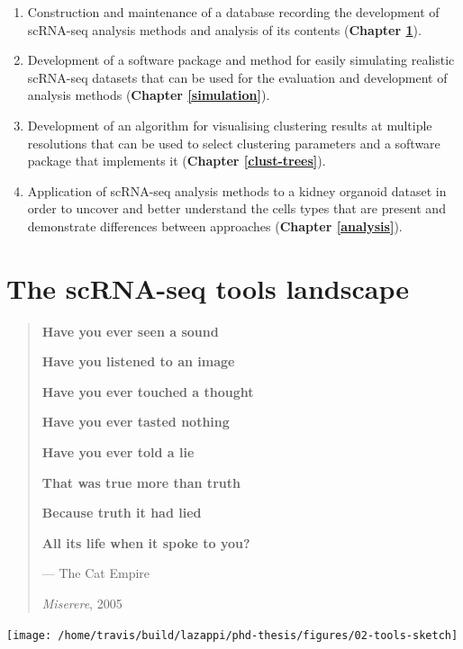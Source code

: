 \documentclass[11pt,a4paper,titlepage,twoside,openright]{style/unimelbthesis}
\theoremstyle{definition}
\theoremstyle{definition}
\theoremstyle{definition}
\theoremstyle{remark}
\begin{document}
\begin{mainmatter}
\begin{enumerate}
\def\labelenumi{\arabic{enumi}.}
\item
  Construction and maintenance of a database recording the development of scRNA-seq analysis methods and analysis of its contents (\textbf{Chapter \ref{tools}}).
\item
  Development of a software package and method for easily simulating realistic scRNA-seq datasets that can be used for the evaluation and development of analysis methods (\textbf{Chapter \ref{simulation}}).
\item
  Development of an algorithm for visualising clustering results at multiple resolutions that can be used to select clustering parameters and a software package that implements it (\textbf{Chapter \ref{clust-trees}}).
\item
  Application of scRNA-seq analysis methods to a kidney organoid dataset in order to uncover and better understand the cells types that are present and demonstrate differences between approaches (\textbf{Chapter \ref{analysis}}).
\end{enumerate}

\hypertarget{tools}{%
\chapter{The scRNA-seq tools landscape}\label{tools}}

\begin{quote}
\textbf{Have you ever seen a sound}

\textbf{Have you listened to an image}

\textbf{Have you ever touched a thought}

\textbf{Have you ever tasted nothing}

\textbf{Have you ever told a lie}

\textbf{That was true more than truth}

\textbf{Because truth it had lied}

\textbf{All its life when it spoke to you?}

--- The Cat Empire

\emph{Miserere}, 2005
\end{quote}

\begin{center}\texttt{[image: /home/travis/build/lazappi/phd-thesis/figures/02-tools-sketch]} \end{center}

\clearpage


\end{mainmatter}
\end{document}
